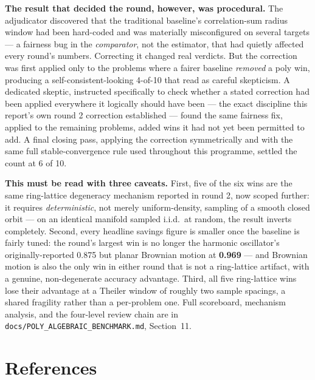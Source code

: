 \documentclass[11pt,a4paper]{article}
\begin{document}
\textbf{The result that decided the round, however, was procedural.} The
adjudicator discovered that the traditional baseline's correlation-sum
radius window had been hard-coded and was materially misconfigured on
several targets --- a fairness bug in the \emph{comparator}, not the
estimator, that had quietly affected every round's numbers. Correcting it
changed real verdicts. But the correction was first applied only to the
problems where a fairer baseline \emph{removed} a poly win, producing a
self-consistent-looking 4-of-10 that read as careful skepticism. A
dedicated skeptic, instructed specifically to check whether a stated
correction had been applied everywhere it logically should have been ---
the exact discipline this report's own round 2 correction established ---
found the same fairness fix, applied to the remaining problems, added wins
it had not yet been permitted to add. A final closing pass, applying the
correction symmetrically and with the same full stable-convergence rule
used throughout this programme, settled the count at 6 of 10.

\textbf{This must be read with three caveats.} First, five of the six wins
are the same ring-lattice degeneracy mechanism reported in round 2, now
scoped further: it requires \emph{deterministic}, not merely uniform-density,
sampling of a smooth closed orbit --- on an identical manifold sampled
i.i.d.\ at random, the result inverts completely. Second, every headline
savings figure is smaller once the baseline is fairly tuned: the round's
largest win is no longer the harmonic oscillator's originally-reported
0.875 but planar Brownian motion at \textbf{0.969} --- and Brownian motion
is also the only win in either round that is not a ring-lattice artifact,
with a genuine, non-degenerate accuracy advantage. Third, all five
ring-lattice wins lose their advantage at a Theiler window of roughly two
sample spacings, a shared fragility rather than a per-problem one. Full
scoreboard, mechanism analysis, and the four-level review chain are in
\texttt{docs/POLY\_ALGEBRAIC\_BENCHMARK.md}, Section~11.

\section*{References}
\end{document}
